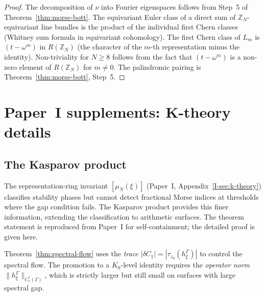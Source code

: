 \begin{proof}
The decomposition of $\nu$ into Fourier eigenspaces
follows from Step~5 of Theorem~\ref{thm:morse-bott}.
The equivariant Euler class of a direct sum of
$\mathbb{Z}_N$-equivariant line bundles is the product
of the individual first Chern classes
(Whitney sum formula in equivariant cohomology).
The first Chern class of $L_m$ is $(t - \omega^m)$ in
$R(\mathbb{Z}_N)$ (the character of the $m$-th
representation minus the identity).
Non-triviality for $N \ge 8$ follows from the fact
that $(t - \omega^m)$ is a non-zero element of
$R(\mathbb{Z}_N)$ for $m \ne 0$.
The palindromic pairing is Theorem~\ref{thm:morse-bott},
Step~5.
\end{proof}

\section{Paper~I supplements: K-theory details}
\label{sec:kasparov}

\subsection{The Kasparov product}
\label{sec:kasparov-construction}

The representation-ring invariant $[\mu_N(\xi)]$
(Paper~I, Appendix~\ref*{I-sec:k-theory})
classifies stability phases but cannot detect fractional
Morse indices at thresholds where the gap condition fails.
The Kasparov product provides this finer information,
extending the classification to arithmetic surfaces.
The theorem statement is reproduced from Paper~I for
self-containment; the detailed proof is given here.

Theorem~\ref{thm:spectral-flow} uses the \emph{trace}
$|\delta C_1| = |\tau_{z_0}(h_\xi^\Gamma)|$ to control
the spectral flow.
The promotion to a $K_0$-level identity requires the
\emph{operator norm} $\|h_\xi^\Gamma\|_{C^*_r(\Gamma)}$,
which is strictly larger but still small on surfaces with
large spectral gap.


